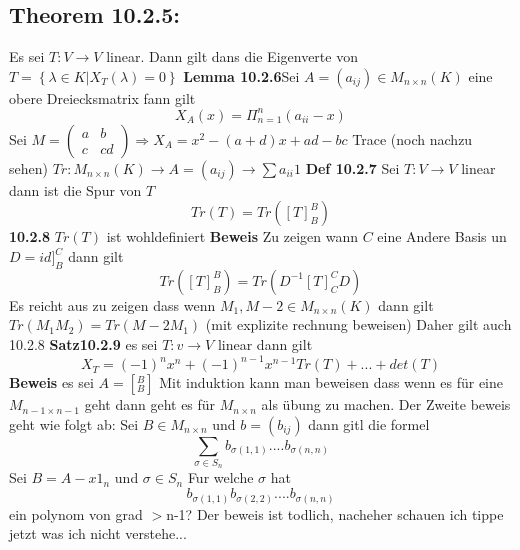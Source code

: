 \documentclass{article}
\begin{document}
\subsection{Theorem 10.2.5:} Es sei $T:V\rightarrow V$ linear. Dann gilt dans die Eigenverte von $T=\left\lbrace\lambda \in K|X_T(\lambda)=0\right\rbrace$
\newline
\textbf{Lemma 10.2.6}Sei $A=(a_{ij})\in M_{n\times n}(K)$ eine obere Dreiecksmatrix fann gilt \[X_A(x)=\Pi_{n=1}^n(a_{ii}-x)\]
Sei $M=\begin{pmatrix}a&b\\c&cd\end{pmatrix} \Rightarrow X_A=x^2-(a+d)x+ad-bc$\newline
 Trace (noch nachzu sehen) $Tr:M_{n\times n}(K)\rightarrow A=(a_{ij})\rightarrow\sum a_{ii}1$
\textbf{Def 10.2.7} Sei $T:V\rightarrow V$ linear dann ist die Spur von $T$ \[Tr(T)=Tr([T]^B_B)\]
\textbf{10.2.8} $Tr(T)$ ist wohldefiniert
\newline\textbf{Beweis} Zu zeigen wann $C$ eine Andere Basis un $D=id]^C_B$ dann gilt \[Tr([T]^B_B)=Tr(D^{-1}[T]^C_CD)\]
Es reicht aus zu zeigen dass wenn $M_1,M-2\in M_{n\times n}(K)$ dann gilt $Tr(M_1M_2)=Tr(M-2M_1)$ (mit explizite rechnung beweisen)\newline
Daher gilt auch 10.2.8\newline
\textbf{Satz10.2.9} es sei $T:v\rightarrow V$ linear dann gilt \[X_T=(-1)^nx^n+(-1)^{n-1}x^{n-1}Tr(T)+...+det(T)\]
\textbf{Beweis} es sei $A=[^B_B]$ Mit induktion kann man beweisen dass wenn es für eine $M_{n-1\times n-1}$ geht dann geht es für $M_{n\times n}$ als übung  zu machen.
Der Zweite beweis geht wie folgt ab:
\newline
Sei $B\in M_{n\times n}$ und $b=(b_{ij})$ dann gitl die formel
\[\sum_{\sigma\in S_n}b_{\sigma(1,1)}....b_{\sigma(n,n)}\]
Sei $B=A-x1_n$ und $\sigma\in S_n$ Fur welche $\sigma$ hat \[b_{\sigma(1,1)}b_{\sigma(2,2)}....b_{\sigma(n,n)}\] ein polynom von grad $>$n-1?
Der beweis ist todlich, nacheher schauen ich tippe jetzt was ich nicht verstehe...
\end{document}
